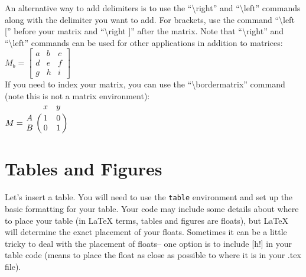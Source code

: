 \documentclass[12pt,notitlepage]{article}		%
\begin{document}
 
 An alternative way to add delimiters is to use the ``\textbackslash right'' and ``\textbackslash left'' commands along with the delimiter you want to add.  For brackets, use the command ``\textbackslash left ['' before your matrix and ``\textbackslash right ]'' after the matrix.  Note that ``\textbackslash right'' and ``\textbackslash left'' commands can be used for other applications in addition to matrices:\\
 
 $M_b = 
 \left [
\begin{matrix}
  a & b & c \\
  d & e & f \\
  g & h & i
 \end{matrix}
 \right ]$\\
 
 If you need to index your matrix, you can use the ``\textbackslash bordermatrix'' command (note this is not a matrix environment):\\
 
 
$ M = \bordermatrix{~ & x & y \cr
                  A & 1 & 0 \cr
                  B & 0 & 1 \cr}$\\
                  
                  

\section{Tables and Figures}

Let's insert a table.  You will need to use the \texttt{table} environment and set up the basic formatting for your table.  Your code may include some details about where to place your table (in LaTeX terms, tables and figures are floats), but LaTeX will determine the exact placement of your floats.  Sometimes it can be a little tricky to deal with the placement of floats-- one option is to include [h!] in your table code (means to place the float as close as possible to where it is in your .tex file).
\end{document}
